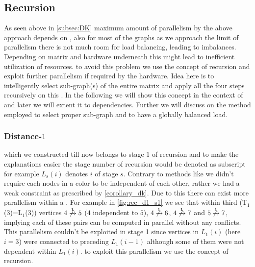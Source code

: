 	\subsection{Recursion}\label{subsec:REC}
	As seen above in \cref{subsec:DK} maximum amount of parallelism by the above approach depends on \totalLvl, also for most of the graphs as we approach the limit of parallelism there is not much room for load balancing, leading to imbalances. Depending on matrix and hardware underneath this might lead to inefficient utilization of resources. \Inorder to avoid this problem we use the concept of recursion and exploit further parallelism if required by the hardware. Idea here is to intelligently select sub-graph(s) of the entire matrix and apply all the four steps recursively on this \subgraph. In the following we will show this concept in the context of \DONE and  later we will extent it to \DK dependencies. Further we will discuss on the method employed to select proper sub-graph and to have a globally balanced load.
	
	\subsubsection{Distance-$1$}
	\LevelGroups which we constructed till now belongs to stage 1 of recursion and to make the explanations easier the stage number of recursion would be denoted as subscript \ie for example $L_s(i)$ denotes \level $i$ of stage $s$. Contrary to methods like \MCfull we didn't require each nodes in a color to be \DONE independent of each other, rather we had a weak constraint as prescribed by \cref{corollary_dk}. Due to this there can exist more parallelism within a \levelGroup. For example in \cref{fig:rec_d1_s1} we see that within third \levelGroup (T$_1$(3)=L$_1$(3)) vertices $4 \not\xrightarrow{1} 5$ ($4$  \DONE independent to $5$), $4 \not\xrightarrow{1} 6$, $4 \not\xrightarrow{1} 7$ and $5 \not\xrightarrow{1} 7$, implying each of these pairs can be computed in parallel without any \DONE conflicts. This parallelism couldn't be exploited in stage 1 since vertices in $L_1(i)$ (here $i=3$) were connected to preceding \level $L_1(i-1)$ although some of them were not \DONE dependent within $L_1(i)$. \Inorder to exploit this parallelism we use the concept of recursion.
	
